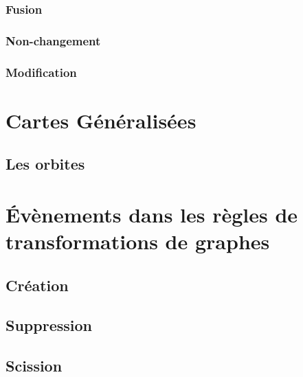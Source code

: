 \subsubsection[Fusion]{Fusion}
\label{sec:graphe-Fusion}



\subsubsection[Non-changement]{Non-changement}
\label{sec:graphe-non-changement}



\subsubsection[Modification]{Modification}
\label{sec:graphe-modification}



\section[Cartes Généralisées]{Cartes Généralisées}
\label{section:cartes-generalisees}



\subsection[Les orbites]{Les orbites}
\label{sec:les-orbites}



\section[Évènements dans les règles de transformation de graphes]{Évènements dans les règles de transformations de graphes}
\label{sec:evenements-regles-base}



\subsection[Création]{Création}
\label{sec:regle-base-creation}

\subsection[Suppression]{Suppression}
\label{sec:regle-base-suppression}



\subsection[Scission]{Scission}
\label{sec:regle-base-scission}



